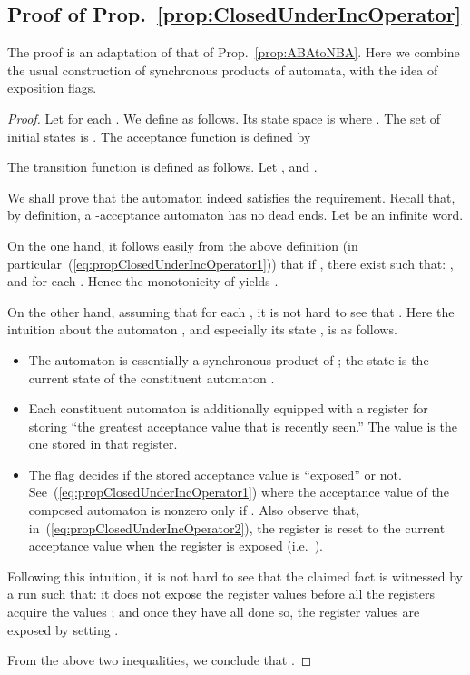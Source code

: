 \documentclass[a4paper,USenglish,numberwithinsect]{lipics}
\theoremstyle{definition}
\theoremstyle{remark}
\theoremstyle{plain}
\begin{document}
\subsection{Proof of Prop.~\ref{prop:ClosedUnderIncOperator}}
The proof is an adaptation of that of Prop.~\ref{prop:ABAtoNBA}. Here we
combine the usual construction of synchronous products of automata, with
the idea of exposition flags.
\begin{proof}
  Let  for each .  We define  as follows. Its state space  is  where
 . The set  of initial states is . The acceptance function is defined by
  
  The transition function 
 is defined as follows. Let , and .
  
 We shall prove that the automaton  indeed
 satisfies the requirement. Recall that, by definition, a
 -acceptance automaton has no dead ends.  Let  be an infinite word. 

 On the one hand, it follows
 easily from
 the above definition (in
 particular~(\ref{eq:propClosedUnderIncOperator1})) that if ,
 there exist  such that:
 , and  for each . Hence the monotonicity of  yields . 

 On the other hand, assuming that
  for each , 
 it is not hard to see that
 . 
 Here the intuition about the automaton 
  , and especially its state
 , is as follows.
 \begin{itemize}
  \item The automaton  is essentially a
	synchronous product of ; the state
	 is the current state of the constituent
	automaton .
  \item Each  constituent
	automaton  is additionally equipped with a register 
	for storing ``the greatest acceptance value that is recently seen.''
The value  is the one stored in that register. 
  \item The flag  decides if the stored
	acceptance value  is ``exposed'' or
	not. See~(\ref{eq:propClosedUnderIncOperator1}) where the
	acceptance value of the composed automaton 
	  is nonzero only if .
	Also observe that, in~(\ref{eq:propClosedUnderIncOperator2}),
	the register  is reset to the current acceptance value
	 when the register is exposed (i.e.\ ).
 \end{itemize}
Following this intuition, it is not hard to see that the claimed fact   is witnessed by a run
 such that: it does not expose the register values before
all the
 registers acquire the values ; and once they
 have all done so, the register values are exposed by setting .


 From the above two inequalities, we conclude that
 .
\end{proof}
\end{document}
